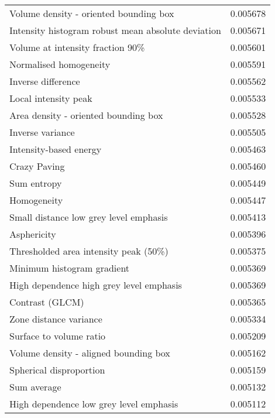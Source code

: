 \begin{longtable}{|lr|}
Volume density - oriented bounding box             &        0.005678 \\
Intensity histogram robust mean absolute deviation &        0.005671 \\
Volume at intensity fraction 90\%                   &        0.005601 \\
Normalised homogeneity                             &        0.005591 \\
Inverse difference                                 &        0.005562 \\
Local intensity peak                               &        0.005533 \\
Area density - oriented bounding box               &        0.005528 \\
Inverse variance                                   &        0.005505 \\
Intensity-based energy                             &        0.005463 \\
Crazy Paving                                       &        0.005460 \\
Sum entropy                                        &        0.005449 \\
Homogeneity                                        &        0.005447 \\
Small distance low grey level emphasis             &        0.005413 \\
Asphericity                                        &        0.005396 \\
Thresholded area intensity peak (50\%)              &        0.005375 \\
Minimum histogram gradient                         &        0.005369 \\
High dependence high grey level emphasis           &        0.005369 \\
Contrast (GLCM)                                    &        0.005365 \\
Zone distance variance                             &        0.005334 \\
Surface to volume ratio                            &        0.005209 \\
Volume density - aligned bounding box              &        0.005162 \\
Spherical disproportion                            &        0.005159 \\
Sum average                                        &        0.005132 \\
High dependence low grey level emphasis            &        0.005112 \\

\end{longtable}
